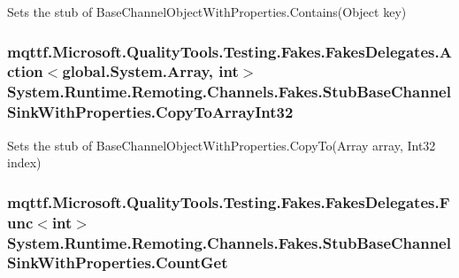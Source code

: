 Sets the stub of Base\-Channel\-Object\-With\-Properties.\-Contains(\-Object key)

\hypertarget{class_system_1_1_runtime_1_1_remoting_1_1_channels_1_1_fakes_1_1_stub_base_channel_sink_with_properties_acd0ec6b97b9f72bf187fb981a80e9f3c}{
\subsubsection[{Copy\-To\-Array\-Int32}]{\setlength{\rightskip}{0pt plus 5cm}mqttf.\-Microsoft.\-Quality\-Tools.\-Testing.\-Fakes.\-Fakes\-Delegates.\-Action$<$global.\-System.\-Array, int$>$ System.\-Runtime.\-Remoting.\-Channels.\-Fakes.\-Stub\-Base\-Channel\-Sink\-With\-Properties.\-Copy\-To\-Array\-Int32}}\label{class_system_1_1_runtime_1_1_remoting_1_1_channels_1_1_fakes_1_1_stub_base_channel_sink_with_properties_acd0ec6b97b9f72bf187fb981a80e9f3c}


Sets the stub of Base\-Channel\-Object\-With\-Properties.\-Copy\-To(\-Array array, Int32 index)

\hypertarget{class_system_1_1_runtime_1_1_remoting_1_1_channels_1_1_fakes_1_1_stub_base_channel_sink_with_properties_af3e6061c9ccc54465a3c66ebcc9d0a32}{
\subsubsection[{Count\-Get}]{\setlength{\rightskip}{0pt plus 5cm}mqttf.\-Microsoft.\-Quality\-Tools.\-Testing.\-Fakes.\-Fakes\-Delegates.\-Func$<$int$>$ System.\-Runtime.\-Remoting.\-Channels.\-Fakes.\-Stub\-Base\-Channel\-Sink\-With\-Properties.\-Count\-Get}}\label{class_system_1_1_runtime_1_1_remoting_1_1_channels_1_1_fakes_1_1_stub_base_channel_sink_with_properties_af3e6061c9ccc54465a3c66ebcc9d0a32}


